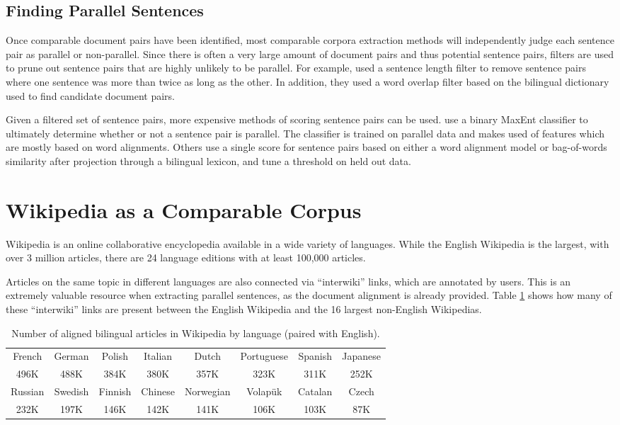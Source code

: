 \subsection{Finding Parallel Sentences}
Once comparable document pairs have been identified, most comparable corpora
extraction methods will independently judge each sentence pair as parallel or
non-parallel. Since there is often a very large amount of document pairs and
thus potential sentence pairs, filters are used to prune out sentence pairs that
are highly unlikely to be parallel. For example, \citet{Munteanu05} used a
sentence length filter to remove sentence pairs where one sentence was more than
twice as long as the other. In addition, they used a word overlap filter based
on the bilingual dictionary used to find candidate document pairs.

Given a filtered set of sentence pairs, more expensive methods of scoring
sentence pairs can be used. \citet{Munteanu05} use a binary MaxEnt
classifier to ultimately determine whether or not a sentence pair is parallel.
The classifier is trained on parallel data and makes used of features which are
mostly based on word alignments. Others
\cite{Fung04a,Fung04b,Tillmann09a,Tillmann09b} use a single score for sentence
pairs based on either a word alignment model or bag-of-words similarity after
projection through a bilingual lexicon, and tune a threshold on held out data.

\section{Wikipedia as a Comparable Corpus}
\label{sec:wiki}
Wikipedia \citep{wikipedia} is an online collaborative encyclopedia available in
a wide variety of languages.  While the English Wikipedia is the largest, with
over 3 million articles, there are 24 language editions with at least 100,000
articles.

Articles on the same topic in different languages are also connected via
``interwiki'' links, which are annotated by users.  This is an extremely
valuable resource when extracting parallel sentences, as the document alignment
is already provided.  
Table \ref{table:interwiki} shows how
many of these ``interwiki'' links are present between the English Wikipedia and the
16 largest non-English Wikipedias.

\begin{table}
\small
\begin{center}
\begin{tabular}{|c|c|c|c|c|c|c|c|}
\hline
French & German & Polish & Italian & Dutch & Portuguese & Spanish & Japanese \\
496K & 488K & 384K & 380K & 357K & 323K & 311K & 252K\\
\hline
Russian & Swedish & Finnish & Chinese & Norwegian & Volap\"{u}k & Catalan & Czech \\
232K & 197K & 146K & 142K & 141K & 106K & 103K & 87K\\
\hline
\end{tabular}
\end{center}
\caption{Number of aligned bilingual articles in Wikipedia by language (paired with English).}
\label{table:interwiki}
\end{table}

